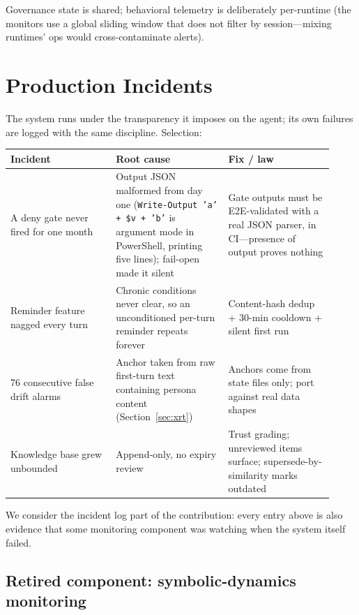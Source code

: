 \documentclass{article}
\begin{document}
Governance state is shared; behavioral telemetry is deliberately per-runtime (the monitors use a global sliding window that does not filter by session---mixing runtimes' ops would cross-contaminate alerts).

\section{Production Incidents}\label{sec:incidents}

The system runs under the transparency it imposes on the agent; its own failures are logged with the same discipline. Selection:

\begin{center}
\begin{tabular}{p{0.30\linewidth}p{0.32\linewidth}p{0.30\linewidth}}
\toprule
Incident & Root cause & Fix / law \\
\midrule
A deny gate never fired for one month & Output JSON malformed from day one (\texttt{Write-Output 'a' + \$v + 'b'} is argument mode in PowerShell, printing five lines); fail-open made it silent & Gate outputs must be E2E-validated with a real JSON parser, in CI---presence of output proves nothing \\
Reminder feature nagged every turn & Chronic conditions never clear, so an unconditioned per-turn reminder repeats forever & Content-hash dedup + 30-min cooldown + silent first run \\
76 consecutive false drift alarms & Anchor taken from raw first-turn text containing persona content (Section~\ref{sec:xrt}) & Anchors come from state files only; port against real data shapes \\
Knowledge base grew unbounded & Append-only, no expiry review & Trust grading; unreviewed items surface; supersede-by-similarity marks outdated \\
\bottomrule
\end{tabular}
\end{center}

We consider the incident log part of the contribution: every entry above is also evidence that some monitoring component was watching when the system itself failed.

\subsection{Retired component: symbolic-dynamics monitoring}
\end{document}
